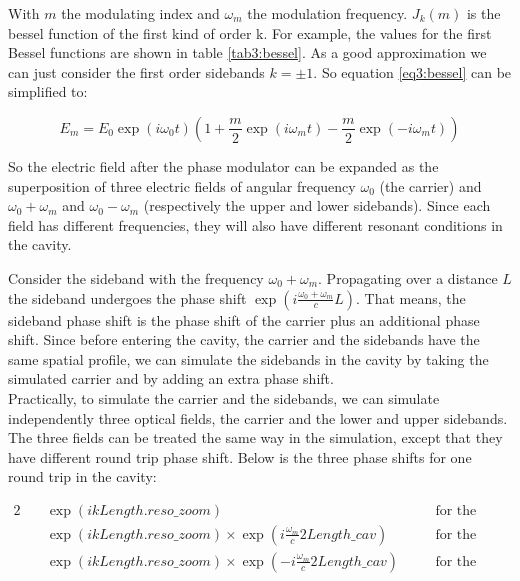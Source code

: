 With $m$ the modulating index and $\omega_m$ the modulation frequency. $J_k(m)$ is the bessel function of the first kind of order k. For example, the values for the first Bessel functions are shown in table \ref{tab3:bessel}. As a good approximation we can just consider the first order sidebands $k = \pm 1$. So equation \ref{eq3:bessel} can be simplified to:

\begin{equation}
E_m = E_0 \exp(i \omega_0 t) (1 + \frac{m}{2} \exp(i \omega_m t) -  \frac{m}{2} \exp(-i \omega_m t))
\end{equation}

So the electric field after the phase modulator can be expanded as the superposition of three electric fields of angular frequency $\omega_0$ (the carrier) and $\omega_0 + \omega_m$ and $\omega_0 - \omega_m$ (respectively the upper and lower sidebands). Since each field has different frequencies, they will also have different resonant conditions in the cavity.

Consider the sideband with the frequency $\omega_0 + \omega_m$. Propagating over a distance $L$ the sideband undergoes the phase shift $ \exp(i \frac{\omega_0 + \omega_m}{c} L)$. That means, the sideband phase shift is the phase shift of the carrier plus an additional phase shift. Since before entering the cavity, the carrier and the sidebands have the same spatial profile, we can simulate the sidebands in the cavity by taking the simulated carrier and by adding an extra phase shift.\\

Practically, to simulate the carrier and the sidebands, we can simulate independently three optical fields, the carrier and the lower and upper sidebands. The three fields can be treated the same way in the simulation, except that they have different round trip phase shift. Below is the three phase shifts for one round trip in the cavity:

\begin{alignat}{2}
    \quad & \exp(i k Length.reso\_zoom) &\quad&   \text{for the carrier} \nonumber \\
    \quad & \exp(i k Length.reso\_zoom) \times \exp(i \frac{\omega_m}{c} 2 Length\_cav) && \text{for the upper sidebands} \nonumber \\
    \quad & \exp(i k Length.reso\_zoom) \times \exp(-i \frac{\omega_m}{c} 2 Length\_cav) && \text{for the lower sidebands}
\label{eq3:sid23}
\end{alignat}

